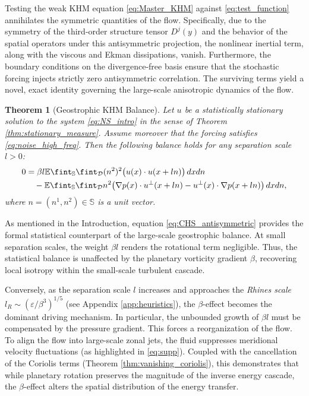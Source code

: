 \documentclass[11pt,a4paper]{article}
\numberwithin{equation}{section}
\newtheorem{theorem}{Theorem}%
\numberwithin{theorem}{section}
\numberwithin{remark}{section}
\numberwithin{definition}{section}
\begin{document}
Testing the weak KHM equation \eqref{eq:Master_KHM} against \eqref{eq:test_function} annihilates the symmetric quantities of the flow. Specifically, due to the symmetry of the third-order structure tensor $D^j(y)$ and the behavior of the spatial operators under this antisymmetric projection, the nonlinear inertial term, along with the viscous and Ekman dissipations, vanish. Furthermore, the boundary conditions on the divergence-free basis ensure that the stochastic forcing injects strictly zero antisymmetric correlation. The surviving terms yield a novel, exact identity governing the large-scale anisotropic dynamics of the flow.

\begin{theorem}[Geostrophic KHM Balance]\label{thm:antisymmetric_balance}
Let $u$ be a statistically stationary solution to the system \eqref{eq:NS_intro} in the sense of Theorem \ref{thm:stationary_measure}. Assume moreover that the forcing satisfies \eqref{eq:noise_high_freq}. Then the following balance holds for any separation scale $l > 0$:
\begin{align}\label{eq:CHS_antisymmetric}
    0 &= \beta l \mathbb{E} \fint_{\mathbb{S}}\fint_{\mathcal{D}} (n^2)^2 \big( u(x) \cdot u(x+ln) \big) \, dxdn \notag \\
    &\quad - \mathbb{E} \fint_{\mathbb{S}}\fint_{\mathcal{D}} n^2 \big( \nabla p(x) \cdot u^\perp(x+ln) - u^\perp(x) \cdot \nabla p(x+ln) \big) \, dxdn,
 \end{align}
 where $n=(n^1,n^2) \in \mathbb{S}$ is a unit vector.
\end{theorem}
As mentioned in the Introduction, equation \eqref{eq:CHS_antisymmetric} provides the formal statistical counterpart of the large-scale geostrophic balance. 
At small separation scales, the weight $\beta l$ renders the rotational term negligible. Thus, the statistical balance is unaffected by the planetary vorticity gradient $\beta$, recovering local isotropy within the small-scale turbulent cascade.

Conversely, as the separation scale $l$ increases and approaches the \textit{Rhines scale} $l_R \sim (\varepsilon/\beta^3)^{1/5}$ (see Appendix \ref{app:heuristics}), the $\beta$-effect becomes the dominant driving mechanism. In particular, the unbounded growth of $\beta l$ must be compensated by the pressure gradient. This forces a reorganization of the flow. To align the flow into large-scale zonal jets, the fluid suppresses meridional velocity fluctuations (as highlighted in \eqref{eq:supp}). Coupled with the cancellation of the Coriolis terms (Theorem \ref{thm:vanishing_coriolis}), this demonstrates that while planetary rotation preserves the magnitude of the inverse energy cascade, the $\beta$-effect alters the spatial distribution of the energy transfer.
\end{document}
